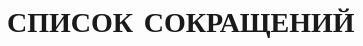 



\providecommand{\firstpagenumber}{2}


\setcounter{page}{\firstpagenumber}

\newpage
\renewcommand{\contentsname}{СОДЕРЖАНИЕ}
\begingroup
\titleformat{\section}{\bfseries\centering}{\thesection}{0.5em}{}
\tableofcontents
\endgroup
\newpage

\section*{\hspace*{\gostindent}СПИСОК СОКРАЩЕНИЙ}

